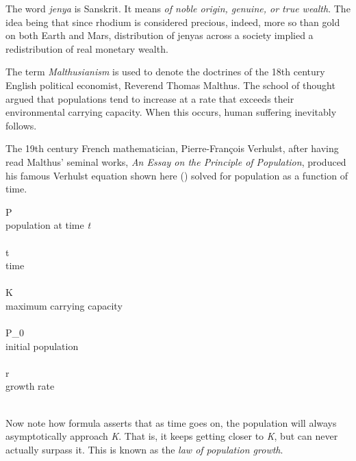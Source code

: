     {}

The word {\it jenya} is Sanskrit. It means {\it of noble origin, genuine, or true wealth}. The idea being that since rhodium is considered precious, indeed, more so than gold on both Earth and Mars, distribution of jenyas across a society implied a redistribution of real monetary wealth.
\stopdefinition

The term {\it Malthusianism} is used to denote the doctrines of the 18th century English political economist, Reverend Thomas Malthus. The school of thought argued that populations tend to increase at a rate that exceeds their environmental carrying capacity. When this occurs, human suffering inevitably follows. 

The 19th century French mathematician, Pierre-François Verhulst, after having read Malthus' seminal works, {\it An Essay on the Principle of Population}, produced his famous Verhulst equation shown here () solved for population as a function of time.
\crlf

\startformula
{}
\stopformula
\startlegend
\leg P \\ population at time {\it t} \\ \\
\leg t \\ time \\ \\
\leg K \\ maximum carrying capacity \\ \\
\leg P_0 \\ initial population \\ \\
\leg r \\ growth rate \\ \\
\stoplegend
\crlf

Now note how formula  asserts that as time goes on, the population will always asymptotically approach {\it K}. That is, it keeps getting closer to {\it K}, but can never actually surpass it. This is known as the {\it law of population growth}.
\crlf

